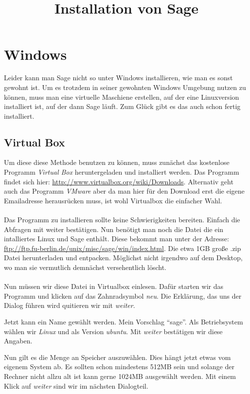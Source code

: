 \documentclass[a4paper,10pt]{article}
\title{Installation von Sage}
\begin{document}
\maketitle
\section{Windows}
Leider kann man Sage nicht so unter Windows installieren, wie man es sonst gewohnt ist. Um es trotzdem in seiner gewohnten Windows
Umgebung nutzen zu können, muss man eine virtuelle Maschiene erstellen, auf der eine Linuxversion installiert ist, auf der dann 
Sage läuft. 
Zum Glück gibt es das auch schon fertig installiert. 

\subsection{Virtual Box}
Um diese diese Methode benutzen zu können, muss zunächst das kostenlose Programm \emph{Virtual Box} heruntergeladen und installiert werden. 
Das Programm findet sich hier: \url{http://www.virtualbox.org/wiki/Downloads}. Alternativ geht auch das Programm \emph{VMware} aber 
da man hier für den Download erst die eigene Emailadresse herausrücken muss, ist wohl Virtualbox die einfacher Wahl.
\paragraph{}
Das Programm zu installieren sollte keine Schwierigkeiten bereiten. Einfach die Abfragen mit weiter bestätigen. Nun benötigt man noch
die Datei die ein intalliertes Linux und Sage enthält. Diese bekommt man unter der Adresse:
 \url{ftp://ftp.fu-berlin.de/unix/misc/sage/win/index.html}. Die etwa 1GB große .zip Datei herunterladen und entpacken.
Möglichst nicht irgendwo auf dem Desktop, wo man sie vermutlich demnächst versehentlich löscht. 
\paragraph{}
Nun müssen wir diese Datei in Virtualbox einlesen. Dafür starten wir das Programm und klicken auf das Zahnradsymbol 
\emph{neu}. Die Erklärung, das uns der Dialog führen wird quitieren wir mit \emph{weiter}.

Jetzt kann ein Name gewählt werden. 
Mein Vorschlag \textquotedblleft sage\textquotedblright. Als Betriebsystem wählen wir \emph{Linux} und als Version \emph{ubuntu}.
Mit \emph{weiter} bestätigen wir diese Angaben. 

Nun gilt es die Menge an Speicher auszuwählen. Dies hängt jetzt etwas vom eigenem 
System ab. Es sollten schon mindestens 512MB sein und solange der Rechner nicht allzu alt ist kann gerne 1024MB
ausgewählt werden. Mit einem Klick auf \emph{weiter} sind wir im nächsten Dialogteil.
\end{document}
